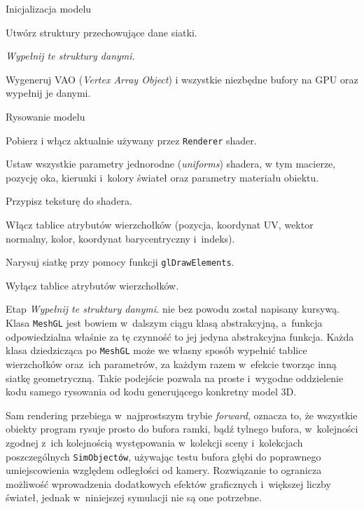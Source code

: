 		\begin{algorithm}[H]
			\label{alg_4_4}
			\caption{Inicjalizacja modelu}	
			
			Utwórz struktury przechowujące dane siatki.
			
			\emph{Wypełnij te struktury danymi.}
			
			Wygeneruj VAO (\emph{Vertex Array Object}) i wszystkie niezbędne bufory na GPU oraz wypełnij je danymi.
		\end{algorithm}
		\newpage
		
		\begin{algorithm}[H]
			\label{alg_4_5}
			\caption{Rysowanie modelu}	
			
			{
			Pobierz i włącz aktualnie używany przez \texttt{Renderer} shader.
			
			Ustaw wszystkie parametry jednorodne (\emph{uniforms}) shadera, w tym macierze, pozycję oka, kierunki i~kolory świateł oraz parametry materiału obiektu.
			
			Przypisz teksturę do shadera.
			
			Włącz tablice atrybutów wierzchołków (pozycja, koordynat UV, wektor normalny, kolor, koordynat barycentryczny i~indeks).
			
			Narysuj siatkę przy pomocy funkcji \texttt{glDrawElements}.
			
			Wyłącz tablice atrybutów wierzchołków.
			}
			
		\end{algorithm}
		
		Etap \emph{Wypełnij te struktury danymi.} nie bez powodu został napisany kursywą. Klasa \texttt{MeshGL} jest bowiem w~dalszym ciągu klasą abstrakcyjną, a~funkcja odpowiedzialna właśnie za tę czynność to jej jedyna abstrakcyjna funkcja. Każda klasa dziedzicząca po \texttt{MeshGL} może we własny sposób wypełnić tablice wierzchołków oraz~ich parametrów, za każdym razem w~efekcie tworząc inną siatkę geometryczną. Takie podejście pozwala na proste i~wygodne oddzielenie kodu samego rysowania od kodu generującego konkretny model 3D.
		
		Sam rendering przebiega w~najprostszym trybie \emph{forward}, oznacza to, że wszystkie obiekty program rysuje prosto do bufora ramki, bądź tylnego bufora, w~kolejności zgodnej z~ich kolejnością występowania w~kolekcji sceny i~kolekcjach poszczególnych \texttt{SimObjectów}, używając testu bufora głębi do poprawnego umiejscowienia względem odległości od kamery. Rozwiązanie to ogranicza możliwość wprowadzenia dodatkowych efektów graficznych i~większej liczby świateł, jednak w~niniejszej symulacji nie są one potrzebne.
		
